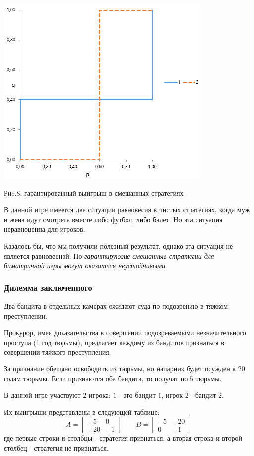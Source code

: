 \documentclass[aps,%
12pt,%
final,%
oneside,
onecolumn,%
musixtex, %
superscriptaddress,%
centertags]{article} %
\theoremstyle{plain}
\theoremstyle{definition}
\theoremstyle{remark}
\begin{document}
\begin{center}
  \includegraphics[scale=0.6]{images/10.png}

  Риc.8: гарантированный выигрыш в смешанных стратегиях
\end{center}

В данной игре имеется две ситуации равновесия в чистых стратегиях, когда муж и жена идут смотреть вместе либо футбол, либо балет. Но эта ситуация неравноценна для игроков.

Казалось бы, что мы получили полезный результат, однако эта ситуация не является равновесной. Но \textit{гарантируюзие смешанные стратегии для биматричной игры могут оказаться неустойчивыми}.

\subsubsection{Дилемма заключенного}

Два бандита в отдельных камерах ожидают суда по подозрению в тяжком преступлении.

Прокурор, имея доказательства в совершении подозреваемыми незначительного проступа (1 год тюрьмы), предлагает каждому из бандитов признаться в совершении тяжкого преступления.

За признание обещано освободить из тюрьмы, но напарник будет осужден к $20$ годам тюрьмы. Если признаются оба бандита, то получат по $5$ тюрьмы.

В данной игре участвуют $2$ игрока: $1$ - это бандит $1$, игрок $2$ - бандит $2$.

Их выигрыши представлены в следующей таблице:
$$A = \begin{bmatrix}
  -5 & 0 \\ 
  -20 & -1
\end{bmatrix} \qquad B = \begin{bmatrix}
  -5 & -20 \\ 
  0 & -1
\end{bmatrix}$$
где первые строки и столбцы - стратегия признаться, а вторая строка и второй столбец - стратегия не признаться.
\end{document}
